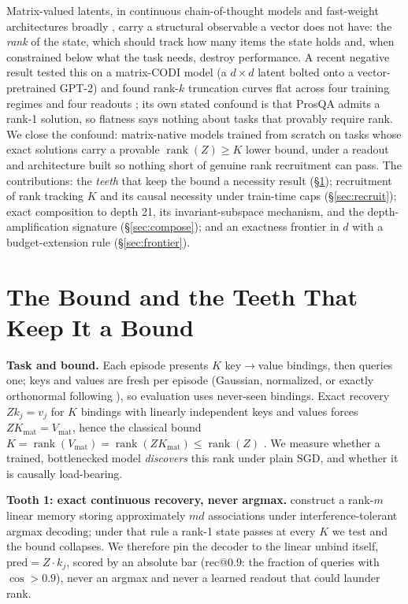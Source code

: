 \documentclass[mlabstract,onecolumn]{jmlr}
\makeatletter
\newcommand{\rank}{\operatorname{rank}}
\newcommand{\recninety}{\mathrm{rec}@0.9}
\newcommand{\Kmat}{K_{\mathrm{mat}}}
\newcommand{\Vmat}{V_{\mathrm{mat}}}
\makeatother
\begin{document}
Matrix-valued latents, in continuous chain-of-thought models
\citep{hao2024coconut} and fast-weight architectures broadly
\citep{schlag2021linear}, carry a structural observable a vector does
not have: the \emph{rank} of the state, which should track how many
items the state holds and, when constrained below what the task needs,
destroy performance.
A recent negative result tested this on a matrix-CODI model (a
$d \times d$ latent bolted onto a vector-pretrained GPT-2) and found
rank-$k$ truncation curves flat across four training regimes and four
readouts \citep{larson2026gradient}; its own stated confound is that
ProsQA admits a rank-1 solution, so flatness says nothing about tasks
that provably require rank. We close the confound: matrix-native
models trained from scratch on tasks whose exact solutions carry a
provable $\rank(Z) \geq K$ lower bound, under a readout and
architecture built so nothing short of genuine rank recruitment can
pass. The contributions: the \emph{teeth} that keep the
bound a necessity result (\S\ref{sec:setup}); recruitment of rank
tracking $K$ and its causal necessity under train-time caps
(\S\ref{sec:recruit}); exact composition to depth 21, its
invariant-subspace mechanism, and the depth-amplification signature
(\S\ref{sec:compose}); and an exactness
frontier in $d$ with a budget-extension rule (\S\ref{sec:frontier}).

\section{The Bound and the Teeth That Keep It a Bound}
\label{sec:setup}

\textbf{Task and bound.} Each episode presents $K$ key$\to$value
bindings, then queries one; keys and values are fresh per episode
(Gaussian, normalized, or exactly orthonormal following
\citealp{mezzadri2007random}), so evaluation uses never-seen bindings. Exact recovery $Z k_j = v_j$
for $K$ bindings with linearly independent keys and values forces
$Z \Kmat = \Vmat$, hence the classical bound
$K = \rank(\Vmat) = \rank(Z \Kmat) \leq \rank(Z)$
\citep{kohonen1972correlation,anderson1972simple}. We measure whether a
trained, bottlenecked model \emph{discovers} this rank under plain SGD,
and whether it is causally load-bearing.

\textbf{Tooth 1: exact continuous recovery, never argmax.}
\citet{nichani2025factual} construct a rank-$m$ linear memory storing
approximately $md$ associations under interference-tolerant argmax
decoding; under that rule a rank-1 state passes at every $K$ we test
and the bound collapses. We therefore pin the decoder to the linear
unbind itself, $\mathrm{pred} = Z \cdot k_j$, scored by an absolute bar
($\recninety$: the fraction of queries with $\cos > 0.9$), never an
argmax and never a learned readout that could launder rank.
\end{document}
